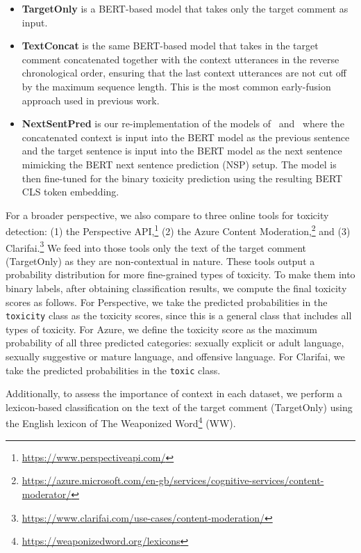 \documentclass[acmsmall]{acmart}
\begin{document}
\begin{itemize}
\item \textbf{TargetOnly} is a BERT-based model that takes only the target comment as input. 
\item \textbf{TextConcat} is the same BERT-based model that takes in the target comment concatenated together with the context utterances in the reverse chronological order, ensuring that the last context utterances are not cut off by the maximum sequence length. This is the most common early-fusion approach used in previous work.
\item \textbf{NextSentPred} is our re-implementation of the models of~\cite{xu-etal-2021-bot} and~\cite{FBK} where the concatenated context is input into the BERT model as the previous sentence and the target sentence is input into the BERT model as the next sentence mimicking the BERT next sentence prediction (NSP) setup. The model is then fine-tuned for the binary toxicity prediction using the resulting BERT CLS token embedding.
\end{itemize}

For a broader perspective, we also compare to three online tools for toxicity detection: (1) the Perspective API,\footnote{\url{https://www.perspectiveapi.com/}} (2) the Azure Content Moderation,\footnote{\url{https://azure.microsoft.com/en-gb/services/cognitive-services/content-moderator/}} and  (3) Clarifai.\footnote{\url{https://www.clarifai.com/use-cases/content-moderation/}} We feed into those tools only the text of the target comment (TargetOnly) as they are non-contextual in nature. These tools output a probability distribution for more fine-grained types of toxicity. To make them into binary labels, after obtaining classification results, we compute the final toxicity scores as follows. For Perspective, we take the predicted probabilities in the \texttt{toxicity} class as the toxicity scores, since this is a general class that includes all types of toxicity. For Azure, we define the toxicity score as the maximum  probability of all three predicted categories: sexually explicit or adult language, sexually suggestive or mature language, and offensive language. For Clarifai, we take the predicted probabilities in the \texttt{toxic} class. 

Additionally, to assess the importance of context in each dataset, we perform a lexicon-based classification on the text of the target comment (TargetOnly) using the English lexicon of The Weaponized Word\footnote{\url{https://weaponizedword.org/lexicons}} (WW). 
\end{document}
